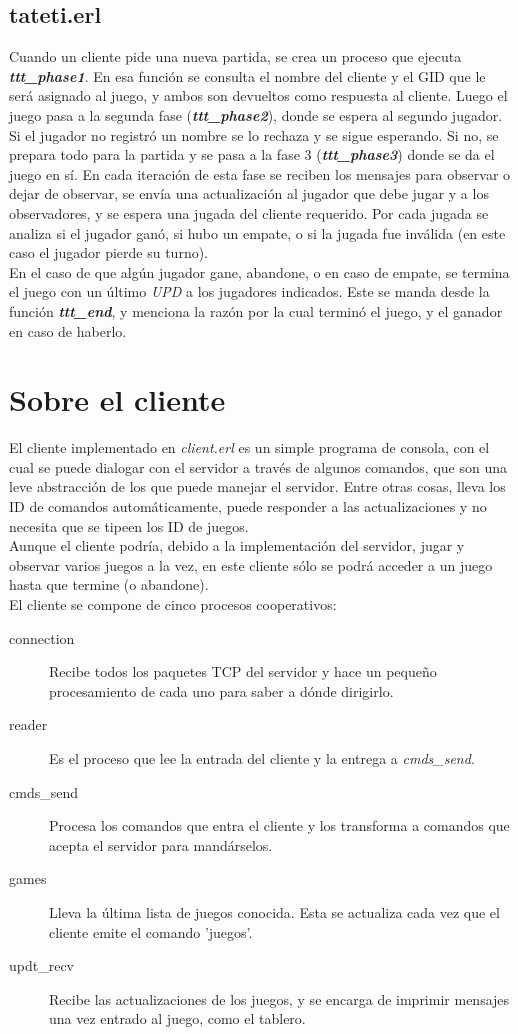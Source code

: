 \documentclass[a4paper]{report}
\newcommand{\femph}[1]{\textbf{\textit{#1}}}
\begin{document}
\subsection*{tateti.erl}
Cuando un cliente pide una nueva partida, se crea un proceso que ejecuta
\femph{ttt\_phase1}. En esa funci\'on se consulta el nombre del cliente
y el GID que le ser\'a asignado al juego, y ambos son devueltos como
respuesta al cliente. Luego el juego pasa a la segunda fase
(\femph{ttt\_phase2}), donde se espera al segundo jugador. Si el jugador
no registr\'o un nombre se lo rechaza y se sigue esperando. Si no, se
prepara todo para la partida y se pasa a la fase 3 (\femph{ttt\_phase3})
donde se da el juego en s\'i. En cada iteraci\'on de esta fase se reciben
los mensajes para observar o dejar de observar, se env\'ia una actualizaci\'on
al jugador que debe jugar y a los observadores, y se espera una jugada del
cliente requerido. Por cada jugada se analiza si el jugador gan\'o, si hubo
un empate, o si la jugada fue inv\'alida (en este caso el jugador pierde su
turno). \\
En el caso de que alg\'un jugador gane, abandone, o en caso de empate, se
termina el juego con un \'ultimo \textit{UPD} a los jugadores indicados.
Este se manda desde la funci\'on \femph{ttt\_end}, y menciona la raz\'on
por la cual termin\'o el juego, y el ganador en caso de haberlo.

\section*{Sobre el cliente}
El cliente implementado en \textit{client.erl} es un simple programa de
consola, con el cual se puede dialogar con el servidor a través de algunos
comandos, que son una leve abstracción de los que puede manejar el servidor.
Entre otras cosas, lleva los ID de comandos automáticamente, puede responder
a las actualizaciones y no necesita que se tipeen los ID de juegos. \\
Aunque el cliente podría, debido a la implementación del servidor, jugar y
observar varios juegos a la vez, en este cliente sólo se podrá acceder a 
un juego hasta que termine (o abandone). \\
El cliente se compone de cinco procesos cooperativos:
\begin{description}
	\item[connection] Recibe todos los paquetes TCP del servidor y hace un
	pequeño procesamiento de cada uno para saber a dónde dirigirlo.
	\item[reader] Es el proceso que lee la entrada del cliente y la entrega
	a \textit{cmds\_send}.
	\item[cmds\_send] Procesa los comandos que entra el cliente y los 
	transforma a comandos que acepta el servidor para mandárselos.
	\item[games] Lleva la última lista de juegos conocida. Esta se actualiza
	cada vez que el cliente emite el comando 'juegos'.
	\item[updt\_recv] Recibe las actualizaciones de los juegos, y se encarga
	de imprimir mensajes una vez entrado al juego, como el tablero.
\end{description}
\end{document}
